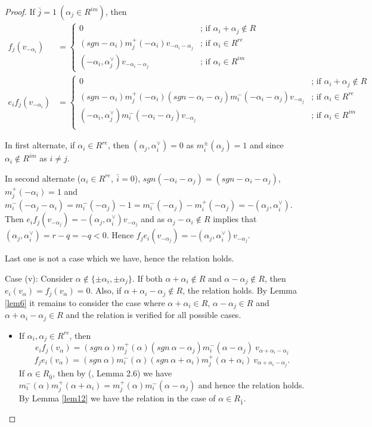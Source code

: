 \documentclass[11pt]{amsart}
\theoremstyle{plain}
\theoremstyle{definition}
\numberwithin{equation}{section}
\newcommand{\al}{\alpha}
\begin{document}
\begin{proof}
		If $\bar{j}=1~(\al_j\in R^{im})$, then 
		\begin{align*}
			f_j(v_{-\alpha_i})&=\begin{cases}
				0&\text{; if }\al_i+\al_j\notin R\\
				(sgn-\al_i)m_j^+(-\alpha_i)v_{-\al_i-\alpha_j}& \text{; if }\al_i\in R^{re}\\
				(-\al_i,\al_j^{\vee})v_{-\al_i-\al_j}&\text{; if }\al_i\in R^{im}
			\end{cases}\\
			e_if_j(v_{-\alpha_i})&=\begin{cases}
				0&\text{; if }\al_i+\al_j\notin R\\
				(sgn-\al_i)m_j^+(-\alpha_i)(sgn-\al_i-\al_j)m_i^-(-\al_i-\al_j)v_{-\alpha_j}& \text{; if }\al_i\in R^{re}\\
				(-\al_i,\al_j^{\vee})m_i^-(-\al_i-\al_j)v_{-\al_j}&\text{; if }\al_i\in R^{im}\\
			\end{cases}
		\end{align*}
		
		In first alternate, if $\al_i\in R^{re}$, then $(\al_j,\al_i^{\vee})=0$ as $m_i^{\pm}(\al_j)=1$ and since $\al_i\notin R^{im}$ as $i\neq j$.
		
		In second alternate ($\al_i\in R^{re},~\bar i=0$), $sgn(-\al_i-\al_j)=(sgn-\al_i-\al_j)$, $m_j^+(-\al_i)=1$ and $m_i^-(-\al_j-\al_i)=m_i^-(-\al_j)-1=m_i^-(-\al_j)-m_i^+(-\al_j)=-(\al_j,\al_i^{\vee})$. Then $e_if_j(v_{-\al_j})=-(\al_j,\al_i^{\vee})v_{-\al_j}$ and as $\al_j-\al_i\notin R$ implies that $(\al_j,\al_i^{\vee})=r-q=-q<0$. Hence $f_je_i(v_{-\al_j})=-(\al_j,\al_i^{\vee})v_{-\al_j}$.
		
		Last one is not a case which we have, hence the relation holds.
		
		Case (v): Consider $\alpha\notin\{\pm\alpha_i,\pm\alpha_j\}$. If both $\al+\al_i\notin R$ and $\al-\al_j\notin R$, then $e_i(v_{\al})=f_j(v_{\al})=0$. Also, if $\al+\al_i-\al_j\notin R$, the relation holds. By Lemma \ref{lem6} it remains to consider the case where $\al+\al_i\in R$, $\al-\al_j\in R$ and $\al+\al_i-\al_j\in R$ and the relation is verified for all possible cases.
		\begin{itemize}
			\item[1.] If $\al_i,\al_j\in R^{re}$, then $$e_if_j(v_{\al})=(sgn~\al)m_j^+(\al)(sgn~\al-\al_j)m_i^-(\al-\al_j)~v_{\al+\al_i-\al_j}$$ $$f_je_i(v_{\al})=(sgn~\al)m_i^-(\al)(sgn~\al+\al_i)m_j^+(\al+\al_i)~v_{\al+\al_i-\al_j}.$$
			If $\al\in R_{\bar{0}}$, then by (\cite{geck2017construction}, Lemma 2.6) we have $m_i^-(\al)m_j^+(\al+\al_i)=m_j^+(\al)m_i^-(\al-\al_j)$ and hence the relation holds. By Lemma \ref{lem12} we have the relation in the case of $\al\in R_{\bar{1}}$.
			

\end{itemize}
\end{proof}
\end{document}
